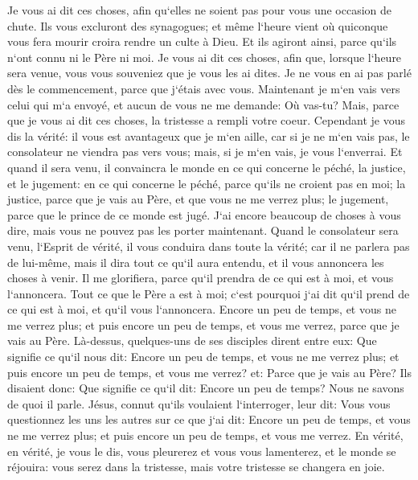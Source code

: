 \verse Je vous ai dit ces choses, afin qu`elles ne soient pas pour vous une occasion de chute. 
\verse Ils vous excluront des synagogues; et même l`heure vient où quiconque vous fera mourir croira rendre un culte à Dieu. 
\verse Et ils agiront ainsi, parce qu`ils n`ont connu ni le Père ni moi. 
\verse Je vous ai dit ces choses, afin que, lorsque l`heure sera venue, vous vous souveniez que je vous les ai dites. Je ne vous en ai pas parlé dès le commencement, parce que j`étais avec vous. 
\verse Maintenant je m`en vais vers celui qui m`a envoyé, et aucun de vous ne me demande: Où vas-tu? 
\verse Mais, parce que je vous ai dit ces choses, la tristesse a rempli votre coeur. 
\verse Cependant je vous dis la vérité: il vous est avantageux que je m`en aille, car si je ne m`en vais pas, le consolateur ne viendra pas vers vous; mais, si je m`en vais, je vous l`enverrai. 
\verse Et quand il sera venu, il convaincra le monde en ce qui concerne le péché, la justice, et le jugement: 
\verse en ce qui concerne le péché, parce qu`ils ne croient pas en moi; 
\verse la justice, parce que je vais au Père, et que vous ne me verrez plus; 
\verse le jugement, parce que le prince de ce monde est jugé. 
\verse J`ai encore beaucoup de choses à vous dire, mais vous ne pouvez pas les porter maintenant. 
\verse Quand le consolateur sera venu, l`Esprit de vérité, il vous conduira dans toute la vérité; car il ne parlera pas de lui-même, mais il dira tout ce qu`il aura entendu, et il vous annoncera les choses à venir. 
\verse Il me glorifiera, parce qu`il prendra de ce qui est à moi, et vous l`annoncera. 
\verse Tout ce que le Père a est à moi; c`est pourquoi j`ai dit qu`il prend de ce qui est à moi, et qu`il vous l`annoncera. 
\verse Encore un peu de temps, et vous ne me verrez plus; et puis encore un peu de temps, et vous me verrez, parce que je vais au Père. 
\verse Là-dessus, quelques-uns de ses disciples dirent entre eux: Que signifie ce qu`il nous dit: Encore un peu de temps, et vous ne me verrez plus; et puis encore un peu de temps, et vous me verrez? et: Parce que je vais au Père? 
\verse Ils disaient donc: Que signifie ce qu`il dit: Encore un peu de temps? Nous ne savons de quoi il parle. 
\verse Jésus, connut qu`ils voulaient l`interroger, leur dit: Vous vous questionnez les uns les autres sur ce que j`ai dit: Encore un peu de temps, et vous ne me verrez plus; et puis encore un peu de temps, et vous me verrez. 
\verse En vérité, en vérité, je vous le dis, vous pleurerez et vous vous lamenterez, et le monde se réjouira: vous serez dans la tristesse, mais votre tristesse se changera en joie. 

